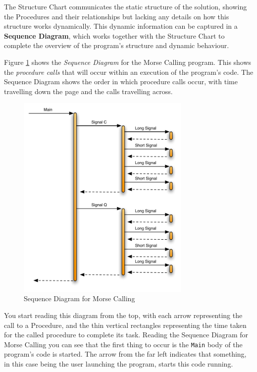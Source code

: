 The Structure Chart communicates the static structure of the solution, showing the Procedures and their relationships but lacking any details on how this structure works dynamically. This dynamic information can be captured in a \textbf{Sequence Diagram}, which works together with the Structure Chart to complete the overview of the program's structure and dynamic behaviour.

Figure \ref{fig:procedure-decl-morsecalling-sequence} shows the \emph{Sequence Diagram} for the Morse Calling program. This shows the \emph{procedure calls} that will occur within an execution of the program's code. The Sequence Diagram shows the order in which procedure calls occur, with time travelling down the page and the calls travelling across. 

\begin{figure}[htbp]
   \centering
   \includegraphics[width=0.75\textwidth]{./topics/procedure-decl/diagrams/MorseCallingSequenceDiagram} 
   \caption{Sequence Diagram for Morse Calling}
   \label{fig:procedure-decl-morsecalling-sequence}
\end{figure}

You start reading this diagram from the top, with each arrow representing the call to a Procedure, and the thin vertical rectangles representing the time taken for the called procedure to complete its task. Reading the Sequence Diagram for Morse Calling you can see that the first thing to occur is the \texttt{Main} body of the program's code is started. The arrow from the far left indicates that something, in this case being the user launching the program, starts this code running.


